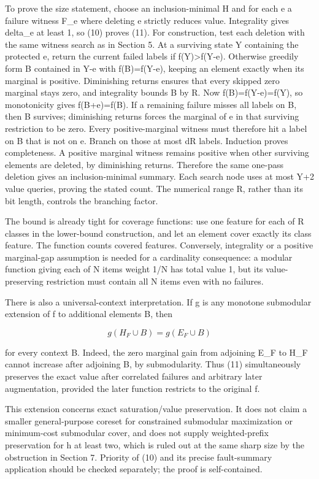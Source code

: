 To prove the size statement, choose an inclusion-minimal H and for each e a failure witness F\_e where deleting e strictly reduces value. Integrality gives delta\_e at least 1, so (10) proves (11). For construction, test each deletion with the same witness search as in Section 5. At a surviving state Y containing the protected e, return the current failed labels if f(Y)\textgreater f(Y-e). Otherwise greedily form B contained in Y-e with f(B)=f(Y-e), keeping an element exactly when its marginal is positive. Diminishing returns ensures that every skipped zero marginal stays zero, and integrality bounds \textbar B\textbar{} by R. Now f(B)=f(Y-e)=f(Y), so monotonicity gives f(B+e)=f(B). If a remaining failure misses all labels on B, then B survives; diminishing returns forces the marginal of e in that surviving restriction to be zero. Every positive-marginal witness must therefore hit a label on B that is not on e. Branch on those at most dR labels. Induction proves completeness. A positive marginal witness remains positive when other surviving elements are deleted, by diminishing returns. Therefore the same one-pass deletion gives an inclusion-minimal summary. Each search node uses at most \textbar Y\textbar+2 value queries, proving the stated count. The numerical range R, rather than its bit length, controls the branching factor.

The bound is already tight for coverage functions: use one feature for each of R classes in the lower-bound construction, and let an element cover exactly its class feature. The function counts covered features. Conversely, integrality or a positive marginal-gap assumption is needed for a cardinality consequence: a modular function giving each of N items weight 1/N has total value 1, but its value-preserving restriction must contain all N items even with no failures.

There is also a universal-context interpretation. If g is any monotone submodular extension of f to additional elements B, then

\[
g(H_F\cup B)=g(E_F\cup B)
\]

for every context B. Indeed, the zero marginal gain from adjoining E\_F to H\_F cannot increase after adjoining B, by submodularity. Thus (11) simultaneously preserves the exact value after correlated failures and arbitrary later augmentation, provided the later function restricts to the original f.

This extension concerns exact saturation/value preservation. It does not claim a smaller general-purpose coreset for constrained submodular maximization or minimum-cost submodular cover, and does not supply weighted-prefix preservation for h at least two, which is ruled out at the same sharp size by the obstruction in Section 7. Priority of (10) and its precise fault-summary application should be checked separately; the proof is self-contained.

